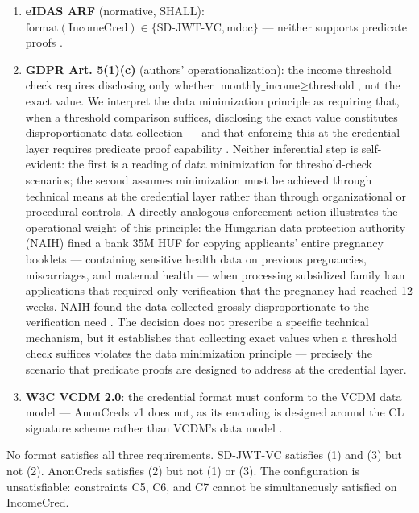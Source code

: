 \begin{enumerate}
\def\labelenumi{\arabic{enumi}.}
\tightlist
\item
  \textbf{eIDAS ARF} (normative, SHALL): \(\text{format}(\text{IncomeCred}) \in \{\text{SD-JWT-VC}, \text{mdoc}\}\) --- neither supports predicate proofs \citep{noauthor_eu-digital-identity-walleteudi-doc-architecture-and-reference-framework_2026}.
\item
  \textbf{GDPR Art. 5(1)(c)} (authors' operationalization): the income threshold check requires disclosing only whether \(\text{monthly\_income} \geq \text{threshold}\), not the exact value. We interpret the data minimization principle as requiring that, when a threshold comparison suffices, disclosing the exact value constitutes disproportionate data collection --- and that enforcing this at the credential layer requires predicate proof capability \citep{gdpr}. Neither inferential step is self-evident: the first is a reading of data minimization for threshold-check scenarios; the second assumes minimization must be achieved through technical means at the credential layer rather than through organizational or procedural controls. A directly analogous enforcement action illustrates the operational weight of this principle: the Hungarian data protection authority (NAIH) fined a bank 35M HUF for copying applicants' entire pregnancy booklets --- containing sensitive health data on previous pregnancies, miscarriages, and maternal health --- when processing subsidized family loan applications that required only verification that the pregnancy had reached 12 weeks. NAIH found the data collected grossly disproportionate to the verification need \citep{noauthor_naih_2020}. The decision does not prescribe a specific technical mechanism, but it establishes that collecting exact values when a threshold check suffices violates the data minimization principle --- precisely the scenario that predicate proofs are designed to address at the credential layer.
\item
  \textbf{W3C VCDM 2.0}: the credential format must conform to the VCDM data model --- AnonCreds v1 does not, as its encoding is designed around the CL signature scheme rather than VCDM's data model \citep{manu_verifiable_2025} \citep{curran2022anoncreds}.
\end{enumerate}

No format satisfies all three requirements. SD-JWT-VC satisfies (1) and (3) but not (2). AnonCreds satisfies (2) but not (1) or (3). The configuration is unsatisfiable: constraints C5, C6, and C7 cannot be simultaneously satisfied on IncomeCred.

